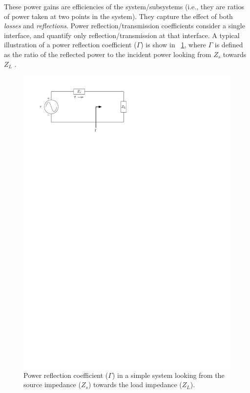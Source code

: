 \documentclass[twocolumn]{autart}
\begin{document}
These power gains are efficiencies of the system/subsystems (i.e., they are ratios of power taken at two points in the system).
They capture the effect of both \emph{losses} and \emph{reflections}.
Power reflection/transmission coefficients consider a single interface, and quantify only reflection/transmission at that interface.
A typical illustration of a power reflection coefficient ($\Gamma$) is show in \figurename~\ref{fig:wec_as_multiport_reflection_coefficient}, where $\Gamma$ is defined as the ratio of the reflected power to the incident power looking from $Z_s$ towards $Z_L$ \cite{Kurokawa:1965aa}.
%
\begin{figure}[tb]
        \centering
        \includegraphics[width=1\columnwidth]{wec_as_multiport_reflection_coefficient.pdf}
        \caption{Power reflection coefficient ($\Gamma$) in a simple system looking from the source impedance ($Z_s$) towards the load impedance ($Z_L$).}
        \label{fig:wec_as_multiport_reflection_coefficient}
\end{figure}
\end{document}
